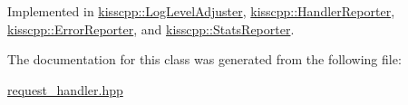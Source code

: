 Implemented in \hyperlink{a00030_a971d59364d21bbaa283ea520caefa604}{kisscpp\-::\-Log\-Level\-Adjuster}, \hyperlink{a00027_a5085be2e4dcfa1e98bf517c8d0b5443f}{kisscpp\-::\-Handler\-Reporter}, \hyperlink{a00023_a7afc458c0a447f93f138f006acb57117}{kisscpp\-::\-Error\-Reporter}, and \hyperlink{a00043_af57d8c01b118a4693b8b226c3f9dbbe5}{kisscpp\-::\-Stats\-Reporter}.



The documentation for this class was generated from the following file\-:\begin{DoxyCompactItemize}
\item 
\hyperlink{a00073}{request\-\_\-handler.\-hpp}\end{DoxyCompactItemize}
